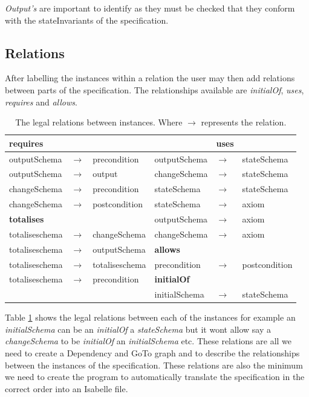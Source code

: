  \emph{Output's} are important to identify as they must be checked that they
conform with the stateInvariants of the specification.
\subsection{Relations}
\label{subsec:zdrarelations}

After labelling the instances within a relation the user may then add relations
between parts of the specification. The relationships available are
\emph{initialOf}, \emph{uses}, \emph{requires} and \emph{allows}.

\begin{table}[H]
\begin{tabular}{|lll||lll|}
\hline
\textbf{requires} & & &  & \textbf{uses} & \\
\hline
outputSchema & $\longrightarrow$ & precondition  & outputSchema &
$\longrightarrow$ & stateSchema\\
outputSchema & $\longrightarrow$ & output & changeSchema & $\longrightarrow$ &
stateSchema \\
changeSchema & $\longrightarrow$ & precondition  & stateSchema &
$\longrightarrow$ & stateSchema \\
changeSchema & $\longrightarrow$ & postcondition  & stateSchema &
$\longrightarrow$ & axiom \\
\cline{1-3}
\textbf{totalises} & &  & outputSchema & $\longrightarrow$ & axiom \\
\cline{1-3}
totaliseschema & $\longrightarrow$ & changeSchema  & changeSchema & $\longrightarrow$
& axiom \\
\cline{4-6}
totaliseschema & $\longrightarrow$ & outputSchema & \textbf{allows}  & & \\
\cline{4-6}
totaliseschema & $\longrightarrow$ & totaliseschema  & precondition  & $\longrightarrow$  &
postcondition \\
\cline{4-6}
totaliseschema & $\longrightarrow$ & precondition & \textbf{initialOf} &  &  \\ 
\cline{4-6}
& &  & initialSchema & $\longrightarrow$ & stateSchema \\ 
\hline
\end{tabular}
\caption{\label{tab:relationsallowed} The legal relations between instances. Where $\longrightarrow$ represents the relation.}
\end{table}

Table \ref{tab:relationsallowed} shows the legal relations between each of the
instances for example an \emph{initialSchema} can be an \emph{initialOf} a
\emph{stateSchema} but it wont allow say a \emph{changeSchema} to be
\emph{initialOf} an \emph{initialSchema} etc. These relations are all we need to
create a Dependency and GoTo graph and to describe the relationships between the
instances of the specification. These relations are also the minimum we need to
create the program to automatically translate the specification in the correct
order into an Isabelle file.

